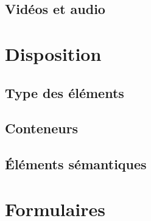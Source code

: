 \documentclass[xcolor=table]{beamer}
\begin{document}
\subsection{Vidéos et audio}


\section{Disposition}

\subsection{Type des éléments}


\subsection{Conteneurs}



\subsection{Éléments sémantiques}


\section{Formulaires}
\end{document}
